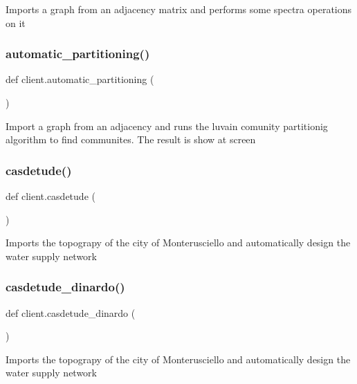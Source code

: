 \begin{DoxyVerb}Imports a graph from an adjacency matrix and performs some spectra operations on it
\end{DoxyVerb}
 \mbox{\label{namespaceclient_aee49d67fb9021b0c97737423810ec697}} 
\subsubsection{automatic\+\_\+partitioning()}
{\footnotesize\ttfamily def client.\+automatic\+\_\+partitioning (\begin{DoxyParamCaption}{ }\end{DoxyParamCaption})}

\begin{DoxyVerb}Import a graph from an adjacency and runs the luvain comunity partitionig algorithm to find communites.
The result is show at screen
\end{DoxyVerb}
 \mbox{\label{namespaceclient_af8a75e716095fad89c5a359bbb43a2be}} 
\subsubsection{casdetude()}
{\footnotesize\ttfamily def client.\+casdetude (\begin{DoxyParamCaption}{ }\end{DoxyParamCaption})}

\begin{DoxyVerb}Imports the topograpy of the city of Monterusciello and automatically design the water supply network
\end{DoxyVerb}
 \mbox{\label{namespaceclient_aa98cb9a9cb0d62af6866771785480b53}} 
\subsubsection{casdetude\+\_\+dinardo()}
{\footnotesize\ttfamily def client.\+casdetude\+\_\+dinardo (\begin{DoxyParamCaption}{ }\end{DoxyParamCaption})}

\begin{DoxyVerb}Imports the topograpy of the city of Monterusciello and automatically design the water supply network
\end{DoxyVerb}
 \mbox{\label{namespaceclient_a9eec904ac0458c1bd157d5775c4e965b}} 
